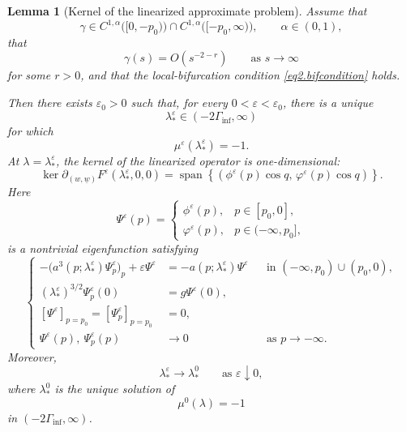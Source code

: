 \documentclass[11pt,reqno]{amsart}
\numberwithin{equation}{section}
\newtheorem{lemma}[theorem]{Lemma}
\theoremstyle{definition}
\theoremstyle{remark}
\begin{document}
\begin{lemma}[Kernel of the linearized approximate problem]
\label{lem4.3}
Assume that
\[
\gamma\in
C^{1,\alpha}\bigl([0,-p_0)\bigr)
\cap
C^{1,\alpha}\bigl([-p_0,\infty)\bigr),
\qquad
\alpha\in(0,1),
\]
that
\[
\gamma(s)=O(s^{-2-r})
\qquad\text{as }s\to\infty
\]
for some $r>0$, and that the local-bifurcation condition \eqref{eq2.bifcondition} holds.

Then there exists $\varepsilon_0>0$ such that, for every
$0<\varepsilon<\varepsilon_0$, there is a unique
\[
\lambda_*^\varepsilon\in(-2\Gamma_{\inf},\infty)
\]
for which
\begin{equation}
\label{eq:crossing}
\mu^\varepsilon(\lambda_*^\varepsilon)=-1.
\end{equation}
At $\lambda=\lambda_*^\varepsilon$, the kernel of the linearized operator is
one-dimensional:
\begin{equation}
\label{eq:kernel-formula}
\ker
\partial_{(w,\underline w)}
F^\varepsilon(\lambda_*^\varepsilon,0,0)
=
\operatorname{span}
\left\{
\left(
\phi^\varepsilon(p)\cos q,\,
\varphi^\varepsilon(p)\cos q
\right)
\right\}.
\end{equation}
Here
\[
\Psi^\varepsilon(p)
=
\begin{cases}
\phi^\varepsilon(p),&p\in[p_0,0],\\
\varphi^\varepsilon(p),&p\in(-\infty,p_0],
\end{cases}
\]
is a nontrivial eigenfunction satisfying
\begin{equation}
\label{eq:one-dimensional-eigenproblem}
\left\{
\begin{aligned}
-\bigl(a^3(p;\lambda_*^\varepsilon)\Psi_p^\varepsilon\bigr)_p
+\varepsilon\Psi^\varepsilon
&=
-a(p;\lambda_*^\varepsilon)\Psi^\varepsilon
&&\text{in }(-\infty,p_0)\cup(p_0,0),\\
(\lambda_*^\varepsilon)^{3/2}\Psi_p^\varepsilon(0)
&=g\Psi^\varepsilon(0),\\
[\Psi^\varepsilon]_{p=p_0}
=
[\Psi_p^\varepsilon]_{p=p_0}
&=0,\\
\Psi^\varepsilon(p),\ \Psi_p^\varepsilon(p)
&\longrightarrow0
&&\text{as }p\to-\infty.
\end{aligned}
\right.
\end{equation}
Moreover,
\begin{equation}
\label{eq:root-convergence}
\lambda_*^\varepsilon\longrightarrow\lambda_*^0
\qquad\text{as }\varepsilon\downarrow0,
\end{equation}
where $\lambda_*^0$ is the unique solution of
\[
\mu^0(\lambda)=-1
\]
in $(-2\Gamma_{\inf},\infty)$.
\end{lemma}
\end{document}
